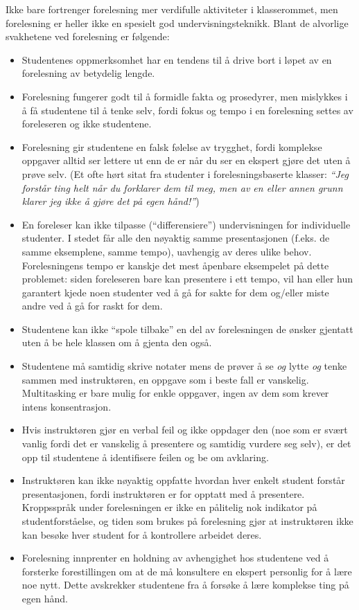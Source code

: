 \noindent
Ikke bare fortrenger forelesning mer verdifulle aktiviteter i klasserommet, men forelesning er heller ikke en spesielt god undervisningsteknikk.  Blant de alvorlige svakhetene ved forelesning er følgende:

\begin{itemize}
\item{} Studentenes oppmerksomhet har en tendens til å drive bort i løpet av en forelesning av betydelig lengde.
\vskip 5pt
\item{} Forelesning fungerer godt til å formidle fakta og prosedyrer, men mislykkes i å få studentene til å tenke selv, fordi fokus og tempo i en forelesning settes av foreleseren og ikke studentene.
\vskip 5pt
\item{} Forelesning gir studentene en falsk følelse av trygghet, fordi komplekse oppgaver alltid ser lettere ut enn de er når du ser en ekspert gjøre det uten å prøve selv.  (Et ofte hørt sitat fra studenter i forelesningsbaserte klasser: {\it ``Jeg forstår ting helt når du forklarer dem til meg, men av en eller annen grunn klarer jeg ikke å gjøre det på egen hånd!''})
\vskip 5pt
\item{} En foreleser kan ikke tilpasse (``differensiere'') undervisningen for individuelle studenter.  I stedet får alle den nøyaktig samme presentasjonen (f.eks. de samme eksemplene, samme tempo), uavhengig av deres ulike behov.  Forelesningens tempo er kanskje det mest åpenbare eksempelet på dette problemet: siden foreleseren bare kan presentere i ett tempo, vil han eller hun garantert kjede noen studenter ved å gå for sakte for dem og/eller miste andre ved å gå for raskt for dem.
\vskip 5pt
\item{} Studentene kan ikke ``spole tilbake'' en del av forelesningen de ønsker gjentatt uten å be hele klassen om å gjenta den også.
\vskip 5pt
\item{} Studentene må samtidig skrive notater mens de prøver å se {\it og} lytte {\it og} tenke sammen med instruktøren, en oppgave som i beste fall er vanskelig.  Multitasking er bare mulig for enkle oppgaver, ingen av dem som krever intens konsentrasjon.
\vskip 5pt
\item{} Hvis instruktøren gjør en verbal feil og ikke oppdager den (noe som er svært vanlig fordi det er vanskelig å presentere og samtidig vurdere seg selv), er det opp til studentene å identifisere feilen og be om avklaring.
\vskip 5pt
\item{} Instruktøren kan ikke nøyaktig oppfatte hvordan hver enkelt student forstår presentasjonen, fordi instruktøren er for opptatt med å presentere.  Kroppsspråk under forelesningen er ikke en pålitelig nok indikator på studentforståelse, og tiden som brukes på forelesning gjør at instruktøren ikke kan besøke hver student for å kontrollere arbeidet deres.
\vskip 5pt
\item{} Forelesning innprenter en holdning av avhengighet hos studentene ved å forsterke forestillingen om at de må konsultere en ekspert personlig for å lære noe nytt.  Dette avskrekker studentene fra å forsøke å lære komplekse ting på egen hånd.
\end{itemize}

